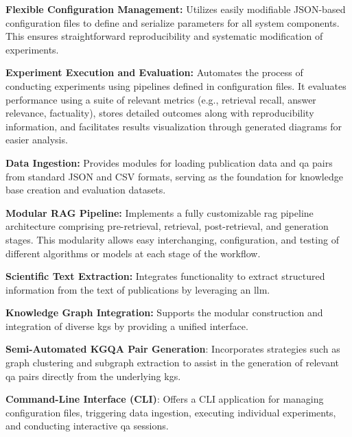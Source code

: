 \begin{enumerate}[label=\textbf{[C\arabic*]}]
    \item \textbf{Flexible Configuration Management:} Utilizes easily modifiable JSON-based configuration files to define and serialize parameters for all system components. This ensures straightforward reproducibility and systematic modification of experiments.

    \item \textbf{Experiment Execution and Evaluation:} Automates the process of conducting experiments using pipelines defined in configuration files. It evaluates performance using a suite of relevant metrics (e.g., retrieval recall, answer relevance, factuality), stores detailed outcomes along with reproducibility information, and facilitates results visualization through generated diagrams for easier analysis.
    
    \item \textbf{Data Ingestion:} Provides modules for loading publication data and \gls{qa} pairs from standard JSON and CSV formats, serving as the foundation for knowledge base creation and evaluation datasets.

    \item \textbf{Modular RAG Pipeline:} Implements a fully customizable \gls{rag} pipeline architecture comprising pre-retrieval, retrieval, post-retrieval, and generation stages. This modularity allows easy interchanging, configuration, and testing of different algorithms or models at each stage of the workflow.
    
    \item \textbf{Scientific Text Extraction:} Integrates functionality to extract structured information from the text of publications by leveraging an \gls{llm}.
    
    \item \textbf{Knowledge Graph Integration:} Supports the modular construction and integration of diverse \glspl{kg} by providing a unified interface.
    
    \item \textbf{Semi-Automated KGQA Pair Generation}: Incorporates strategies such as graph clustering and subgraph extraction to assist in the generation of relevant \gls{qa} pairs directly from the underlying \glspl{kg}. 
    
    \item \textbf{Command-Line Interface (CLI)}: Offers a CLI application for managing configuration files, triggering data ingestion, executing individual experiments, and conducting interactive \gls{qa} sessions.

\end{enumerate}

